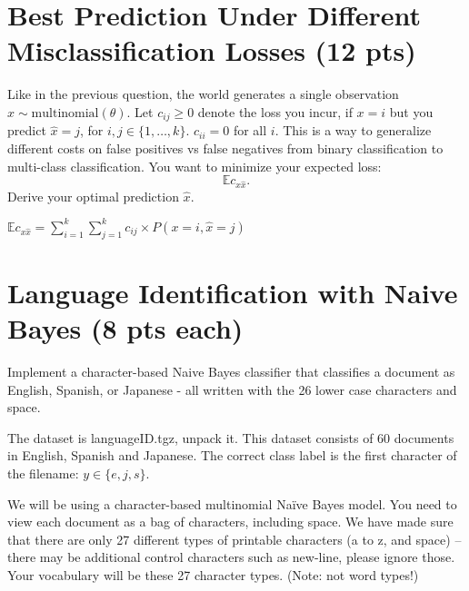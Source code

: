 \documentclass[a4paper]{article}
\theoremstyle{definition}
\def\E{\mathbb E}
\newenvironment{soln}{
    \leavevmode\color{blue}\ignorespaces
}{}
\begin{document}
\section{Best Prediction Under Different Misclassification Losses (12 pts)}
Like in the previous question, 
the world generates a single observation $x \sim \mbox{multinomial}(\theta)$.
Let $c_{ij} \ge 0$ denote the loss you incur, if $x=i$ but you predict $\hat x=j$, for $i,j \in \{1, \ldots, k\}$.
$c_{ii}=0$ for all $i$.
This is a way to generalize different costs on false positives vs false negatives from binary classification to multi-class classification.
You want to minimize your expected loss:
$$\E c_{x \hat x}.$$
Derive your optimal prediction $\hat x$.

\begin{soln}
$\E c_{x \hat x} = \sum_{i=1}^k{\sum_{j=1}^k {c_{ij} \times P(x = i, \hat  x = j) }}$
\end{soln}

\section{Language Identification with Naive Bayes (8 pts each)}
Implement a character-based Naive Bayes classifier that classifies a document as English, Spanish, or Japanese - all written with the 26 lower case characters and space.

The dataset is languageID.tgz, unpack it.
This dataset consists of 60 documents in English, Spanish and Japanese. 
The correct class label is the first character of the filename: $y \in \{e, j, s\}$.

We will be using a character-based multinomial Naïve Bayes model.  You need to view each document as a bag of characters, including space.  We have made sure that there are only 27 different types of printable characters (a to z, and space) -- there may be additional control characters such as new-line, please ignore those.  Your vocabulary will be these 27 character types. (Note: not word types!)
\end{document}

